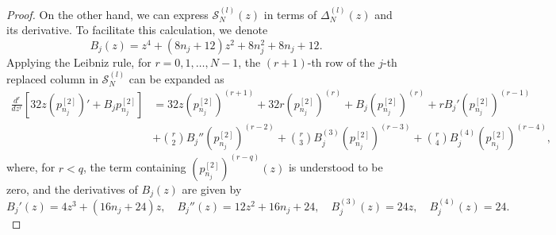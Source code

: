 \documentclass[preprint,3p,10pt]{elsarticle}
\theoremstyle{definition}
\begin{document}
\begin{proof}
On the other hand, we can express \(\mathcal S_N^{(l)}(z)\) in terms of \(\Delta_N^{(l)}(z)\) and its derivative. 
To facilitate this calculation, we denote
\begin{equation}
    B_j(z)=z^4+(8n_j+12)z^2+8n_j^2+8n_j+12.
\end{equation}
Applying the Leibniz rule, for  \(r=0,1,\ldots,N-1\), the $(r+1)$-th row of the \(j\)-th replaced column in \(\mathcal S_N^{(l)}\) can be expanded as
\begin{equation}\label{eqn:expantion of the j-th column}
\begin{aligned}
    \frac{d^r}{dz^r}\left[32z\left(p_{n_j}^{[2]}\right)' +B_j p_{n_j}^{[2]} \right] &=
    32z\left(p_{n_j}^{[2]}\right)^{(r+1)} 
    +32r\left(p_{n_j}^{[2]}\right)^{(r)} 
    +B_j \left(p_{n_j}^{[2]}\right)^{(r)} +rB_j' \left(p_{n_j}^{[2]}\right)^{(r-1)} 
     \\
    &+\binom{r}{2}B_j'' \left(p_{n_j}^{[2]}\right)^{(r-2)} 
    +\binom{r}{3}B_j^{(3)} \left(p_{n_j}^{[2]}\right)^{(r-3)} 
    +\binom{r}{4}B_j^{(4)} \left(p_{n_j}^{[2]}\right)^{(r-4)},
\end{aligned}
\end{equation}
where, for \(r<q\), the term containing 
\(\left(p_{n_j}^{[2]}\right)^{(r-q)}(z)\) is understood to be zero, and the derivatives of $B_j(z)$ are given by
\begin{equation}
    B_j'(z)=4z^3+(16n_j+24)z,\quad
    B_j''(z)=12z^2+16n_j+24,\quad
    B_j^{(3)}(z)=24z,\quad B_j^{(4)}(z)=24.
\end{equation}


\end{proof}
\end{document}
